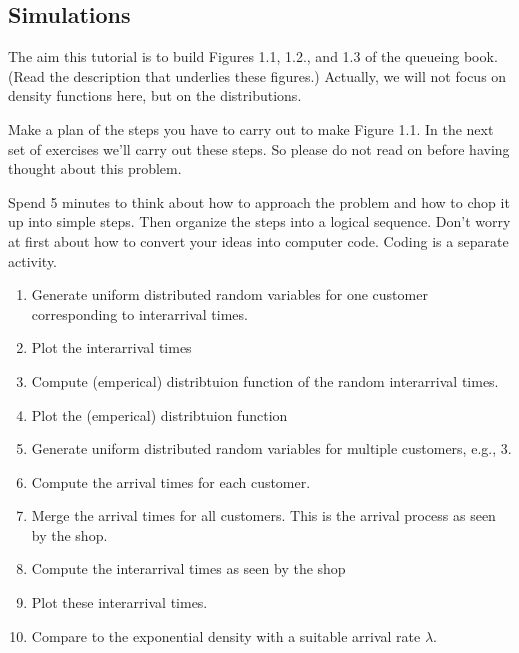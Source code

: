 \documentclass{scrartcl}
\begin{document}
\subsection{Simulations}
\label{sec:simulations}



The aim this tutorial is to build Figures 1.1, 1.2., and 1.3 of the queueing book.  (Read the description that underlies these figures.) Actually, we will not focus on  density functions here, but on the distributions.  

\begin{exercise}
  Make a plan of the steps you have to carry out to make Figure 1.1. In the next set of exercises we'll carry out these steps. So please do not read on before having thought about this problem. 
  \begin{hint}
Spend 5 minutes to think about how to approach the problem and how to chop it up into simple steps. Then organize the steps into a logical sequence. Don't worry at first about how to convert your ideas into computer code.   Coding is a separate activity. 
  \end{hint}
  \begin{solution}
    \begin{enumerate}
    \item Generate  uniform distributed random variables for one customer corresponding to interarrival times.
    \item Plot the interarrival times
    \item Compute (emperical) distribtuion function of the random interarrival times.
    \item Plot the (emperical) distribtuion function
    \item Generate  uniform distributed random variables for multiple customers, e.g., 3. 
    \item Compute the arrival times for each customer.
    \item Merge  the arrival times for all customers. This is the arrival process as seen by the shop.
    \item Compute the interarrival times as seen by the shop
    \item Plot these interarrival times.
    \item Compare to the exponential density with a suitable arrival rate $\lambda$. 
    \end{enumerate}
  \end{solution}
\end{exercise}
\end{document}
